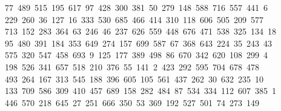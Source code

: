 \begin{tabbing}
\ 77\ 489\ 515\ 195\ 617\ 97\ 428\ 300\ 381\ 50\ 279\ 148\ 588\ 716\ 557\ 441\ 6\\[0pt]
\ 229\ 260\ 36\ 127\ 16\ 333\ 530\ 685\ 466\ 414\ 310\ 118\ 606\ 505\ 209\ 577\\[0pt]
\>\ 713\ 152\ 283\ 364\ 63\ 246\ 46\ 237\ 626\ 559\ 448\ 676\ 471\ 538\ 325\ 134\ 18\\[0pt]
\>\ 95\ 480\ 391\ 184\ 353\ 649\ 274\ 157\ 699\ 587\ 67\ 368\ 643\ 224\ 35\ 243\ 43\\[0pt]
\ 575\ 320\ 547\ 458\ 693\ 9\ 125\ 177\ 389\ 498\ 86\ 670\ 342\ 620\ 108\ 299\ 4\\[0pt]
\ 198\ 526\ 341\ 657\ 518\ 210\ 376\ 55\ 141\ 2\ 423\ 292\ 595\ 704\ 678\ 478\ \\[0pt]
\ 493\ 264\ 167\ 313\ 545\ 188\ 396\ 605\ 105\ 561\ 437\ 262\ 30\ 632\ 235\ 10\\[0pt]
\>\ 133\ 709\ 586\ 309\ 410\ 457\ 689\ 158\ 282\ 484\ 87\ 534\ 334\ 112\ 607\ 385\ 1\\[0pt]
\ 446\ 570\ 218\ 645\ 27\ 251\ 666\ 350\ 53\ 369\ 192\ 527\ 501\ 74\ 273\ 149\ \\[0pt]

\end{tabbing}
